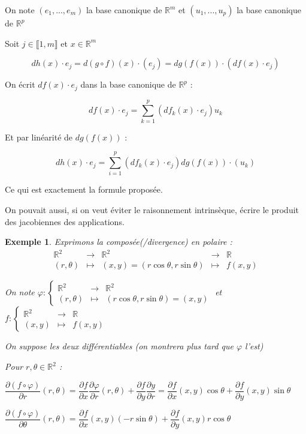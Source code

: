 \documentclass[a4paper,12pt]{book}
\newcommand{\Pre}[1]{\begin{tcolorbox}[sharp corners, colback=white,colframe=green!60!green!30!black!75, title=Preuve]#1\end{tcolorbox}}
\newtheorem{Exe}{Exemple}[section]
\def\R{\mathbb{R}}
\begin{document}
\Pre{On note $(e_1,..., e_m)$ la base canonique de $\R^m$ et $(u_1,..., u_p)$ la base canonique de $\R^p$
\par Soit $j\in\llbracket 1, m\rrbracket$ et $x\in\R^m$
\par $$dh(x)\cdot e_j = d(g\circ f)(x)\cdot (e_j) = dg(f(x))\cdot (df(x)\cdot e_j)$$
\par On écrit $df(x)\cdot e_j$ dans la base canonique de $\R^p$ :
\par $$df(x)\cdot e_j = \sum\limits_{k=1}^p(df_k(x)\cdot e_j)u_k$$
\par Et par linéarité de $dg(f(x))$ :
\par $$dh(x)\cdot e_j = \sum\limits_{i=1}^p(df_k(x)\cdot e_j)dg(f(x))\cdot(u_k)$$
\par Ce qui est exactement la formule proposée.
\par On pouvait aussi, si on veut éviter le raisonnement intrinsèque, écrire le produit des jacobiennes des applications.}
\begin{Exe}
Exprimons la composée(/divergence) en polaire :
$$\begin{array}{ccccc}\R^2 & \to & \R^2 & \to &\R \\(r,\theta) & \mapsto & (x,y) = (r\cos\theta, r\sin\theta) & \mapsto &f(x,y)\end{array}$$
\par On note $\varphi:\left\{\begin{array}{rcl}\R^2 & \to & \R^2 \\ (r,\theta) & \mapsto & (r\cos\theta, r\sin\theta) = (x, y)\end{array}\right.$ et $f:\left\{\begin{array}{rcl}\R^2 & \to & \R \\ (x,y) & \mapsto &f(x, y)\end{array}\right.$
\par On suppose les deux différentiables (on montrera plus tard que $\varphi$ l'est)
\par Pour $r,\theta\in\R^2$ :
\par $\dfrac{\partial (f\circ \varphi)}{\partial r}(r,\theta) = \dfrac{\partial f}{\partial x}\dfrac{\partial \varphi}{\partial r}(r,\theta) + \dfrac{\partial f}{\partial y}\dfrac{\partial y}{\partial r} = \dfrac{\partial f}{\partial x}(x,y)\cos\theta+\dfrac{\partial f}{\partial y}(x,y)\sin\theta$
\par $\dfrac{\partial (f\circ \varphi)}{\partial \theta}(r,\theta) = \dfrac{\partial f}{\partial x}(x,y)(-r\sin\theta)+\dfrac{\partial f}{\partial y}(x,y)r\cos\theta$
\end{Exe}
\end{document}
